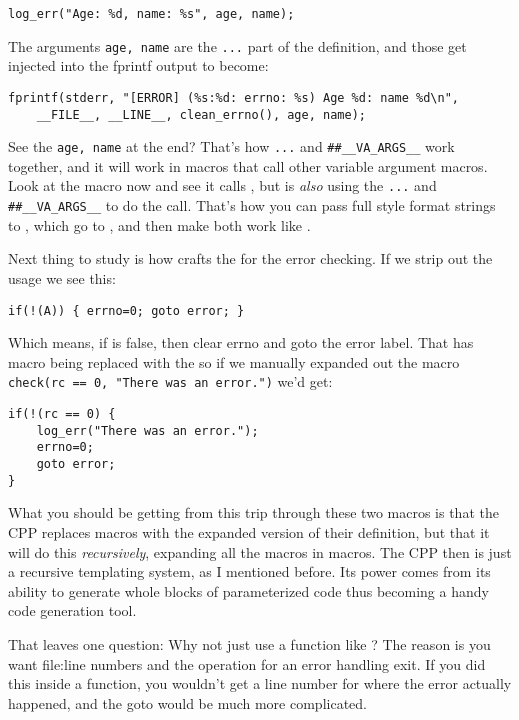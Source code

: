 \verb|log_err("Age: %d, name: %s", age, name);|

The arguments \verb|age, name| are the \verb|...| part of the definition, and those
get injected into the fprintf output to become:

\begin{lstlisting}
fprintf(stderr, "[ERROR] (%s:%d: errno: %s) Age %d: name %d\n",
    __FILE__, __LINE__, clean_errno(), age, name);
\end{lstlisting}

See the \verb|age, name| at the end? That's how \verb|...| and
\verb|##__VA_ARGS__| work together, and it will work in macros that call other
variable argument macros.  Look at the  macro now and see it calls
, but  is \emph{also} using the \verb|...| and
\verb|##__VA_ARGS__| to do the call.  That's how you can pass full
 style format strings to , which go to
, and then make both work like .

Next thing to study is how  crafts the  for the
error checking.  If we strip out the  usage we see this:

\verb|if(!(A)) { errno=0; goto error; }|

Which means, if  is false, then clear errno and goto the error label.
That has  macro being replaced with the  so if
we manually expanded out the macro \verb|check(rc == 0, "There was an error.")|
we'd get:

\begin{lstlisting}
if(!(rc == 0) {
    log_err("There was an error.");
    errno=0;
    goto error;
}
\end{lstlisting}

What you should be getting from this trip through these two macros is that
the CPP replaces macros with the expanded version of their definition, but
that it will do this \emph{recursively}, expanding all the macros in macros.
The CPP then is just a recursive templating system, as I mentioned before.
Its power comes from its ability to generate whole blocks of parameterized
code thus becoming a handy code generation tool.

That leaves one question:  Why not just use a function like ?
The reason is you want file:line numbers and the  operation
for an error handling exit.  If you did this inside a function, you wouldn't
get a line number for where the error actually happened, and the goto would
be much more complicated.

